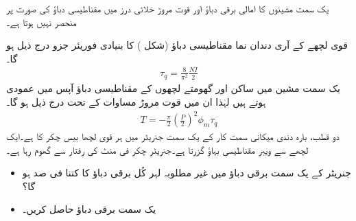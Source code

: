یک سمت  مشینوں کا امالی برقی دباؤ اور قوت مروڑ خلائی درز میں مقناطیسی دباؤ کی صورت پر منحصر نہیں ہوتا ہے۔

 قوی لچھے کے آری دندان نما مقناطیسی دباؤ (شکل )   کا بنیادی فوریئر جزو درج ذیل ہو گا۔
\begin{align}
\tau_q=\frac{8}{\pi^2} \frac{N I}{2}
\end{align}
یک سمت  مشین میں ساکن اور گھومتے لچھوں کے مقناطیسی دباؤ آپس میں عمودی ہوتے ہیں لہٰذا ان میں قوت مروڑ مساوات   کے تحت درج ذیل ہو گا۔
\begin{align}\label{مساوات_یکسمتی_مروڑ}
T=-\frac{\pi}{2}\left( \frac{P}{2}\right)^2 \phi_m \tau_q 
\end{align} 
%
دو قطب، بارہ دندی میکانی سمت کار کے یک سمت  جنریٹر میں ہر قوی لچھا بیس چکر کا ہے۔ایک لچھے سے  ویبر  مقناطیسی بہاؤ گزرتا    ہے۔جنریٹر  چکر فی منٹ کی رفتار سے گھوم رہا ہے۔
\begin{itemize}
\item
جنریٹر کے یک سمت  برقی دباؤ میں غیر مطلوبہ لہر کُل برقی دباؤ کا کتنا فی صد ہو گا؟
\item
یک سمت  برقی دباؤ حاصل کریں۔
\end{itemize}

